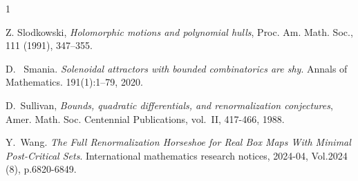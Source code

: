 \documentclass{amsart}
\numberwithin{equation}{section}
\theoremstyle{definition}
\theoremstyle{remark}
\begin{document}
\begin{thebibliography}{1}


    

 Z. Slodkowski, {\em Holomorphic motions and polynomial hulls}, Proc. Am. Math. Soc., 111 (1991), 347–355.

 D. \ Smania. {\em Solenoidal attractors with bounded combinatorics are shy}. Annals of Mathematics. 191(1):1--79, 2020.

 D.\ Sullivan, {\em Bounds, quadratic differentials, and renormalization conjectures},  Amer. Math. Soc. Centennial Publications, vol.\ II,  417-466, 1988.

 Y.\ Wang. {\em The Full Renormalization Horseshoe for Real Box Maps With Minimal Post-Critical Sets}. International mathematics research notices, 2024-04, Vol.2024 (8), p.6820-6849.
\end{thebibliography}
\end{document}
